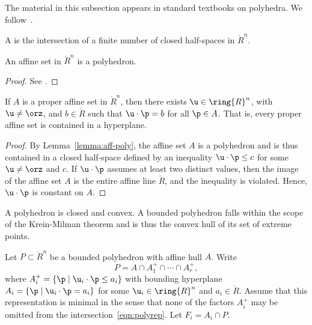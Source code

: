 The material in this subsection appears in standard textbooks on polyhedra.
We follow~\cite{webster:1994}.

\begin{definition}[polyhedron]
A  is the
intersection of a finite number of closed half-spaces in
$\ring{R}^n$.  
\end{definition}
%

\begin{lemma}[]\cutrate{}\label{lemma:aff-poly}
An affine set in $\ring{R}^n$ is a polyhedron.
\end{lemma}

\begin{proof} See \cite[Cor~1.4.2]{webster:1994}.
\end{proof}

\begin{lemma}[]\label{lemma:aff-u}
If $A$ is a proper affine set in $\ring{R}^n$, then there exists $\u\in \ring{R}^n$, with
$\u\ne\orz$, and $b\in\ring{R}$ 
such that $\u\cdot\p = b$ for all $\p\in A$.  That is, every proper affine set
is contained in a hyperplane.
\end{lemma}

\begin{proof}
By Lemma~\ref{lemma:aff-poly},
the affine set $A$ is a polyhedron and is thus contained in a closed half-space defined by an
inequality $\u\cdot\p \le c$ for some $\u\ne \orz$ and $c$.  If $\u\cdot\p$ assumes
at least two distinct values, then the image of the affine set $A$ 
is the entire affine line $\ring{R}$, and the inequality is violated.
Hence, $\u\cdot\p$ is constant on $A$.
\end{proof}

A polyhedron is closed and convex.  A bounded polyhedron falls within
the scope of the Krein-Milman theorem and is thus the convex hull of
its set of extreme points.  %

Let $P\subset\ring{R}^n$ be a bounded polyhedron with affine hull
$A$. Write
\begin{equation}\label{eqn:polyrep}
P = A \cap A^+_1 \cap \cdots \cap A^+_r,
\end{equation}
where $A^+_i = \{\p\mid \u_i\cdot \p \le a_i\}$ with bounding
hyperplane $A_i=\{\p\mid \u_i \cdot \p = a_i\}$ for some $\u_i\in
\ring{R}^n$ and $a_i\in\ring{R}$.  Assume that this representation is
minimal in the sense that none of the factors $A^+_i$ may be omitted from
the intersection~\eqref{eqn:polyrep}.
Let $F_i = A_i\cap P$.  %


